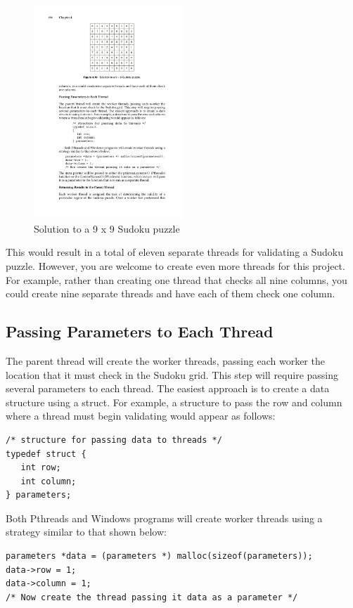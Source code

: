 \begin{figure}[hbp]
\centering
\includegraphics[width=0.5\textwidth]{images/sudoku.pdf}
\caption{Solution to a 9 x 9 Sudoku puzzle}
\label{fig:sudoku}
\end{figure}

This would result in a total of eleven separate threads for validating a Sudoku puzzle. However, you are welcome to create even more threads for this project. For example, rather than creating one thread that checks all nine columns, you could create nine separate threads and have each of them check one column.

\subsection*{Passing Parameters to Each Thread}
The parent thread will create the worker threads, passing each worker the location that it must check in the Sudoku grid. This step will require passing several parameters to each thread. The easiest approach is to create a data structure using a struct. For example, a structure to pass the row and column where a thread must begin validating would appear as follows:
\begin{lstlisting}
/* structure for passing data to threads */ 
typedef struct {
   int row;
   int column; 
} parameters;
\end{lstlisting}

Both Pthreads and Windows programs will create worker threads using a strategy similar to that shown below:
\begin{lstlisting}
parameters *data = (parameters *) malloc(sizeof(parameters)); 
data->row = 1;
data->column = 1;
/* Now create the thread passing it data as a parameter */
\end{lstlisting}

